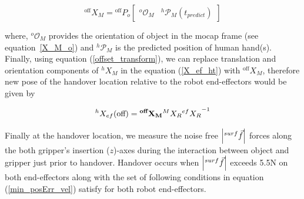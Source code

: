 
\begin{equation}\label{offset_transform}
{}^\text{off}{X}_{M} = 
{}^\text{off}{P}_{o}
 \left[\begin{array}{cc}
{}^{o}\mathcal{O}_M & {}^{h}\mathcal{P}_M(t_{predict})
\end{array}\right]
\end{equation}


where, ${}^{o}\mathcal{O}_M$ provides the orientation of object in the mocap frame (see equation~\ref{X_M_o}) and ${}^{h}\mathcal{P}_M$ is the predicted position of human hand(s). Finally, using equation (\ref{offset_transform}), we can replace translation and orientation components of ${}^{h}{X}_M$ in the equation (\ref{X_ef_ht}) with ${}^\text{off}{X}_{M}$, therefore new pose of the handover location relative to the robot end-effectors would be given by

\begin{equation}
	{}^{h}{X}_{ef}(\text{off}) =  {\bf{}^{\text{\bf off}}{X}_M}  {}^{M}{X}_R {{}^{ef}{X}_R}^{-1}
\end{equation}

Finally at the handover location, we measure the noise free $\abs{{}^{surf}\vec{f}}$ forces along the both gripper's insertion ($z$)-axes during the interaction between object and gripper just prior to handover. Handover occurs when $\abs{{}^{surf}\vec{f}}$ exceeds 5.5N on both end-effectors along with the set of following conditions in equation (\ref{min_posErr_vel}) satisfy for both robot end-effectors.



